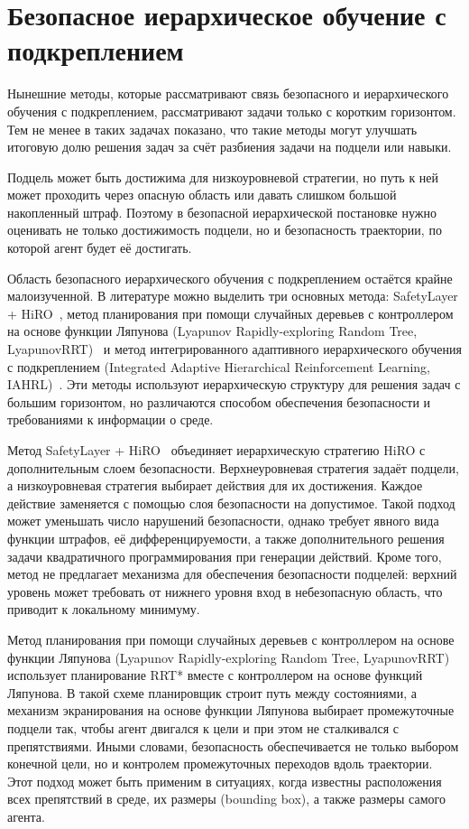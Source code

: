 \section{Безопасное иерархическое обучение с подкреплением}
\label{sec:safe_hrl}

Нынешние методы, которые рассматривают связь безопасного и иерархического обучения с подкреплением, рассматривают задачи только с коротким горизонтом. Тем не менее в таких задачах показано, что такие методы могут улучшать итоговую долю решения задач за счёт разбиения задачи на подцели или навыки.

Подцель может быть достижима для низкоуровневой стратегии, но путь к ней может проходить через опасную область или давать слишком большой накопленный штраф. Поэтому в безопасной иерархической постановке нужно оценивать не только достижимость подцели, но и безопасность траектории, по которой агент будет её достигать.

Область безопасного иерархического обучения с подкреплением остаётся крайне малоизученной. В литературе можно выделить три основных метода: SafetyLayer + HiRO~\cite{safetylayerhiro}, метод планирования при помощи случайных деревьев с контроллером на основе функции Ляпунова (Lyapunov Rapidly-exploring Random Tree, LyapunovRRT)~\cite{lyapunovrrt} и метод интегрированного адаптивного иерархического обучения с подкреплением (Integrated Adaptive Hierarchical Reinforcement Learning, IAHRL)~\cite{iahrl}. Эти методы используют иерархическую структуру для решения задач с большим горизонтом, но различаются способом обеспечения безопасности и требованиями к информации о среде.

Метод SafetyLayer + HiRO~\cite{safetylayerhiro} объединяет иерархическую стратегию HiRO с дополнительным слоем безопасности. Верхнеуровневая стратегия задаёт подцели, а низкоуровневая стратегия выбирает действия для их достижения. Каждое действие заменяется с помощью слоя безопасности на допустимое. Такой подход может уменьшать число нарушений безопасности, однако требует явного вида функции штрафов, её дифференцируемости, а также дополнительного решения задачи квадратичного программирования при генерации действий. Кроме того, метод не предлагает механизма для обеспечения безопасности подцелей: верхний уровень может требовать от нижнего уровня вход в небезопасную область, что приводит к локальному минимуму.

Метод планирования при помощи случайных деревьев с контроллером на основе функции Ляпунова (Lyapunov Rapidly-exploring Random Tree, LyapunovRRT)~\cite{lyapunovrrt} использует планирование RRT* вместе с контроллером на основе функций Ляпунова. В такой схеме планировщик строит путь между состояниями, а механизм экранирования на основе функции Ляпунова выбирает промежуточные подцели так, чтобы агент двигался к цели и при этом не сталкивался с препятствиями. Иными словами, безопасность обеспечивается не только выбором конечной цели, но и контролем промежуточных переходов вдоль траектории. Этот подход может быть применим в ситуациях, когда известны расположения всех препятствий в среде, их размеры (bounding box), а также размеры самого агента.

